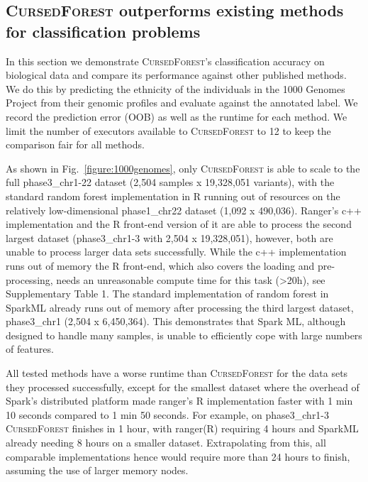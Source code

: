 \documentclass[10pt,letterpaper]{article}
\newcommand{\cursedforest}{\textsc{CursedForest}\xspace}
\begin{document}
\subsection{\cursedforest outperforms existing methods for classification problems}
In this section we demonstrate \cursedforest's classification accuracy on biological data and compare its performance against other published methods. 
We do this by predicting the ethnicity of the individuals in the 1000 Genomes Project from their genomic profiles and evaluate against the annotated label. 
We record the prediction error (OOB) as well as the runtime for each method. 
We limit the number of executors available to \cursedforest to 12 to keep the comparison fair for all methods.  

As shown in Fig.~\ref{figure:1000genomes}, only \cursedforest is able to scale to the full phase3\_chr1-22 dataset (2,504 samples x 19,328,051 variants), with
the standard random forest implementation in R running out of resources on the relatively low-dimensional
phase1\_chr22 dataset (1,092 x 490,036). 
Ranger's c++ implementation and the R front-end version of it are able to process the second largest dataset (phase3\_chr1-3 with 2,504 x 19,328,051), however, both are unable to process larger data sets successfully. 
While the c++ implementation runs out of memory the R front-end, which also covers the loading and pre-processing, needs an unreasonable compute time for this task (>20h), see Supplementary Table 1.
The standard implementation of random forest in SparkML already runs out of memory after processing the third largest dataset, phase3\_chr1 (2,504 x 6,450,364). 
This demonstrates that Spark ML, although designed to handle many samples, is unable to efficiently cope with large numbers of features. 

All tested methods have a worse runtime than \cursedforest for the data sets they processed successfully, except for the smallest dataset where the overhead of Spark's distributed platform made ranger's R implementation faster with 1 min 10 seconds compared to 1 min 50 seconds. For example, on phase3\_chr1-3 \cursedforest finishes in 1 hour, with ranger(R) requiring 4 hours and SparkML already needing 8 hours on a smaller dataset. 
Extrapolating from this, all comparable implementations hence would require more than 24 hours to finish, assuming the use of larger memory nodes.  
\end{document}
